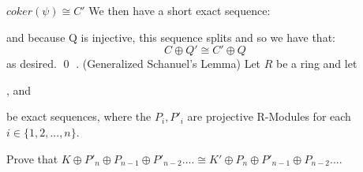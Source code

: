 \documentclass{article}
\begin{document}
 $coker(\psi) \cong C'$ 
\newline
\newline
We then have a short exact sequence:
\newline
{}
\newline
and because Q is injective, this sequence splits and so we have that:
$$C\oplus Q' \cong C'\oplus Q$$
as desired. \qed
{}. (Generalized Schanuel's Lemma) \newline
Let $R$ be a ring and let
\begin{center}
, and
\newline
\newline
{}
\newline
be exact sequences, where the $P_i, P'_i$ are projective R-Modules for each $i\in \{1,2,...,n\}$.  
\end{center}
Prove that
\newline
$K\oplus P'_n \oplus P_{n-1} \oplus P'_{n-2} .... \cong K' \oplus P_n \oplus P'_{n-1} \oplus P_{n-2} .... $
\proof
\end{document}
